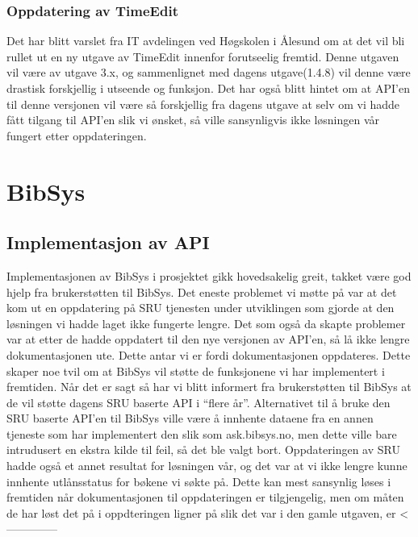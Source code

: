 \documentclass[../main.tex]{subfiles}
\begin{document}
\subsubsection{Oppdatering av TimeEdit}

Det har blitt varslet fra IT avdelingen ved Høgskolen i Ålesund om at det vil bli rullet ut en ny utgave av TimeEdit innenfor forutseelig fremtid. Denne utgaven vil være av utgave 3.x, og sammenlignet med dagens utgave(1.4.8) vil denne være drastisk forskjellig i utseende og funksjon. Det har også blitt hintet om at API’en til denne versjonen vil være så forskjellig fra dagens utgave at selv om vi hadde fått tilgang til API’en slik vi ønsket, så ville sansynligvis ikke løsningen vår fungert etter oppdateringen.

\section{BibSys}

\subsection{Implementasjon av API}

Implementasjonen av BibSys i prosjektet gikk hovedsakelig greit, takket være god hjelp fra brukerstøtten til BibSys. Det eneste problemet vi møtte på var at det kom ut en oppdatering på SRU tjenesten under utviklingen som gjorde at den løsningen vi hadde laget ikke fungerte lengre. Det som også da skapte problemer var at etter de hadde oppdatert til den nye versjonen av API’en, så lå ikke lengre dokumentasjonen ute. Dette antar vi er fordi dokumentasjonen oppdateres. Dette skaper noe tvil om at BibSys vil støtte de funksjonene vi har implementert i fremtiden. Når det er sagt så har vi blitt informert fra brukerstøtten til BibSys at de vil støtte dagens SRU baserte API i “flere år”.
Alternativet til å bruke den SRU baserte API’en til BibSys ville være å innhente dataene fra en annen tjeneste som har implementert den slik som ask.bibsys.no, men dette ville bare intrudusert en ekstra kilde til feil, så det ble valgt bort.\newline 
Oppdateringen av SRU hadde også et annet resultat for løsningen vår, og det var at vi ikke lengre kunne innhente utlånsstatus for bøkene vi søkte på. Dette kan mest sansynlig løses i fremtiden når dokumentasjonen til oppdateringen er tilgjengelig, men om måten de har løst det på i oppdteringen ligner på slik det var i den gamle utgaven, er <--------------
\end{document}
